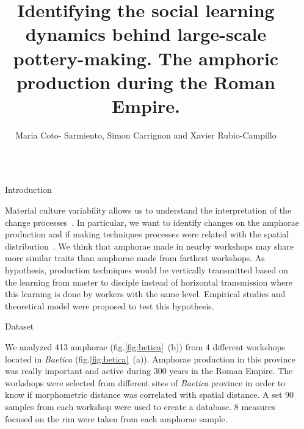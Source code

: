 \documentclass[final]{beamer}
\title{Identifying the social learning dynamics behind large-scale pottery-making. The amphoric production during the Roman Empire.}
\author{Maria Coto- Sarmiento, Simon Carrignon and Xavier Rubio-Campillo} %
\institute{Barcelona Supercomputing Center - University of Barcelona} %
\newlength{\sepwid}
\newlength{\onecolwid}
\begin{document}

\setlength{\belowcaptionskip}{2ex} %
\setlength\belowdisplayshortskip{2ex} %

\begin{frame}[t] %

\begin{columns}[t] %

\begin{column}{\sepwid}\end{column} %

\begin{column}{\onecolwid} %


\begin{block}{Introduction}

\justify

Material culture variability allows us to understand the interpretation of the change processes~\cite{lycett}. In particular, we want to identify changes on the amphorae production and if making techniques processes were related with the spatial distribution~\cite{bjo}. We think that amphorae made in nearby workshops may share more similar traits than amphorae made from farthest workshops. As hypothesis, production techniques would be vertically transmitted based on the learning from master to disciple instead of horizontal transmission where this learning is done by workers with the same level. Empirical studies and theoretical model were proposed to test this hypothesis.
 
  
\end{block}


\begin{block}{Dataset}

\justify
We analyzed 413 amphorae (fig.\ref{fig:betica}~(b)) from 4 different workshops located in \emph{Baetica} (fig.\ref{fig:betica}~(a)). Amphorae production in this province was really important and active during 300 years in the Roman Empire. The workshops were selected from different sites of \emph{Baetica} province in order to know if morphometric distance was correlated with spatial distance. A set 90 samples from each workshop were used to create a database. 8 measures focused on the rim were taken from each amphorae sample. 


\end{block}
\end{column}
\end{columns}
\end{frame}
\end{document}
